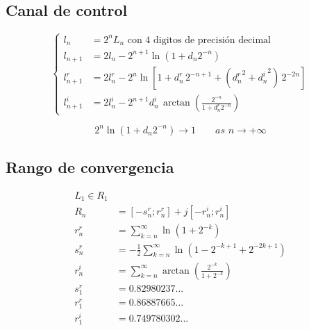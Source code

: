 \documentclass[10pt,a4paper]{book}
\begin{document}
   \subsection{Canal de control}
\begin{equation} \label{eq:bkm_eqs_l}
   \left\{
      \begin{aligned}
         l_n         &= 2^n L_n \,\,\text{con 4 digitos de precisión decimal} \\
         l_{n+1}     &= 2 l_n   - 2^{n+1} \ln( 1 + d_n 2^{-n} )                                             \\
         l_{n+1}^r   &= 2 l_n^r - 2^{n}   \ln[ 1 + d_n^r \, 2^{-n+1} + ({d_n^r}^2 + {d_n^i}^2) \, 2^{-2n} ] \\
         l_{n+1}^i   &= 2 l_n^i - 2^{n+1} d_n^i \, \arctan{ \left( \frac{2^{-n}}{1+d_n^r 2^{-n}} \right) }
      \end{aligned}
   \right.
\end{equation}

\begin{equation} \label{eq:bkm_eqs_l_limit}
   2^{n} \ln( 1 + d_n 2^{-n} ) \rightarrow 1 \qquad as \,\, n \rightarrow +\infty
\end{equation}

   \subsection{Rango de convergencia}

   \begin{equation} \label{eq:convergence_range_E}
      \begin{aligned}
         L_1 \in R_1                                                          \\
         R_n   &= [-s_n^r; r_n^r] + j [-r_n^i; r_n^i]                         \\
         r_n^r &= \sum_{k=n}^{\infty}  \ln(1+2^{-k})                          \\
         s_n^r &= -\frac{1}{2} \sum_{k=n}^{\infty}  \ln(1-2^{-k+1}+2^{-2k+1}) \\
         r_n^i &= \sum_{k=n}^{\infty}  \arctan(\frac{2^{-k}}{1+2^{-k}})       \\
         s_1^r &= 0.82980237...                                               \\
         r_1^r &= 0.86887665...                                               \\
         r_1^i &= 0.749780302...                                              \\
      \end{aligned}
   \end{equation}
\end{document}
